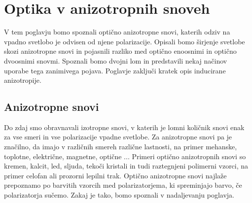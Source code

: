
\chapter{Optika v anizotropnih snoveh}
\label{chap:AnizotropneSnovi}
V tem poglavju bomo spoznali optično anizotropne snovi, katerih odziv na 
vpadno svetlobo je odvisen od njene polarizacije. Opisali bomo 
širjenje svetlobe skozi anizotropne snovi in pojasnili razliko med optično 
enoosnimi in optično dvoosnimi snovmi. Spoznali bomo dvojni lom in 
predstavili nekaj načinov uporabe tega zanimivega pojava. Poglavje zaključi
kratek opis inducirane anizotropije.

\section{Anizotropne snovi}
Do zdaj smo obravnavali izotropne snovi, v katerih je lomni količnik 
snovi enak za vse smeri in vse polarizacije vpadne svetlobe. 
Za anizotropne snovi pa je značilno, da imajo 
v različnih smereh različne lastnosti, na primer mehanske, toplotne, 
električne, magnetne, optične ... Primeri optično 
anizotropnih snovi so kremen, kalcit, led, sljuda, tekoči kristali
in tudi raztegnjeni polimerni vzorci, na primer celofan ali prozorni lepilni trak. 
Optično anizotropne snovi najlaže prepoznamo po barvitih vzorcih med
polarizatorjema, ki spreminjajo barvo, če polarizatorja sučemo. 
Zakaj je tako, bomo spoznali v nadaljevanju poglavja.
